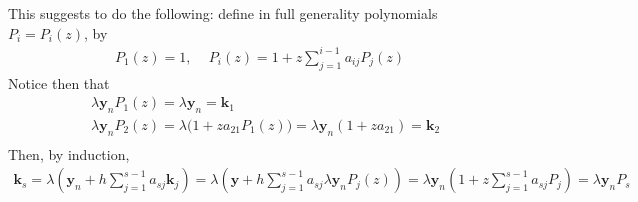 This suggests to do the following: define in full generality polynomials $P_i = P_i(z)$, by
\[
\begin{gathered}
P_1(z) = 1, \quad \, P_i(z) = 1 + z \sum_{j=1}^{i-1} a_{ij} P_j(z)
\end{gathered}
\]
Notice then that
\[
\begin{aligned}
& \lambda \mathbf y_n P_1(z) = \lambda \mathbf y_n = \mathbf k_1 \\
& \lambda \mathbf y_n P_2(z) = \lambda \mathbf (1 + za_{21}P_1(z)) = \lambda \mathbf y_n(1 + za_{21}) = \mathbf{k}_2 \\
\end{aligned}
\]
Then, by induction,
\[
\begin{gathered}
\mathbf{k}_s = \lambda (\mathbf y_n + h \sum_{j=1}^{s-1} a_{sj} \mathbf k_j) = \lambda ( \mathbf y + h \sum_{j=1}^{s-1}a_{sj} \lambda \mathbf y_n P_j(z)) = \lambda \mathbf y_n (1 + z\sum_{j=1}^{s-1} a_{sj} P_j) = \lambda \mathbf y_n P_s
\end{gathered}
\]
